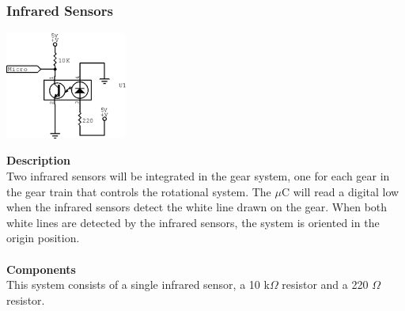 \documentclass[titlepage]{article}
\begin{document}
\newpage
\subsubsection{Infrared Sensors}
\begin{center}
	\includegraphics[width = 0.3\textwidth]{IRSensor.png}
\label{fig:IRSensorFig}
\end{center}
\textbf{Description}\\
Two infrared sensors will be integrated in the gear system, one for each gear in the gear train that controls the rotational system. The $\mu$C will read a digital low when the infrared sensors detect the white line drawn on the gear. When both white lines are detected by the infrared sensors, the system is oriented in the origin position.\\\\
\textbf{Components}\\
This system consists of a single infrared sensor, a 10 k$\Omega$ resistor and a 220 $\Omega$ resistor.



\end{document}
